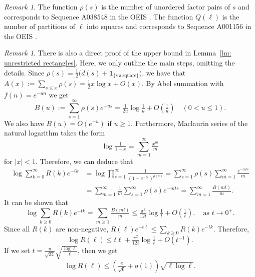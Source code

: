 \documentclass[12pt,a4paper]{amsart}
\numberwithin{equation}{section}
\theoremstyle{plain}
\theoremstyle{definition}
\theoremstyle{remark}
\newtheorem{re}[thm]{Remark}
\begin{document}
\begin{re}
The function $\rho(s)$ is the number of unordered factor pairs of $s$ and corresponds to Sequence A038548 in the OEIS \cite{OEISA038548}. The function $Q(\ell)$ is the number of partitions of $\ell$ into squares and corresponds to Sequence A001156 in the OEIS \cite{OEISA001156}.
\end{re}


\begin{re}
There is also a direct proof of the upper bound in Lemma~\ref{lm: unrestricted rectangles}. Here, we only outline the main steps, omitting the details.
Since
$\rho(s)=\tfrac12\bigl(d(s)+\mathbf 1_{\{s\ \mathrm{a\ square}\}}\bigr)$, we have that
$
A(x):=\sum_{s\le  x}\rho(s)=\tfrac12x\log x+O(x).
$
By Abel summation with $f(n)=e^{-un}$ we get
$$
B(u):=\sum_{s=1}^\infty\rho(s)e^{-us}=\tfrac{1}{2u}\log\tfrac{1}{u}+O\!\left(\tfrac{1}{u}\right)
\quad(0<u\le 1).$$
We also have 
$B(u)=O(e^{-u})$ if $u\ge 1$.
Furthermore, Maclaurin series of the natural logarithm takes the form
$$\log\tfrac{1}{1-x}=\sum_{m=1}^\infty\tfrac{x^{m}}{m}$$ 
for $|x|<1$. %
Therefore, we can deduce that
\begin{align*}
    \log \sum_{k=0}^\infty R(k)e^{-tk}&=\log \prod_{s=1}^{\infty}\tfrac{1}{(1-e^{-ts})^{\rho(s)}}=\sum_{s=1}^\infty\rho(s)
\sum_{m=1}^\infty\tfrac{e^{-mts}}m\\
&=\sum_{m=1}^\infty\tfrac{1}{m}
\sum_{s=1}^\infty\rho(s)e^{-mts}=\sum_{m=1}^\infty\tfrac{B(mt)}{m}.
\end{align*} 
It can be shown that
$$
\log \sum_{k\geq0}R(k)e^{-tk}=\sum_{m\ge1}\tfrac{B(mt)}{m} \le\tfrac{\pi^{2}}{12t}\log\tfrac1t+O\!\left(\tfrac1t\right),\quad \text{as }t\to0^{+}.
$$
Since all $R(k)$ are non-negative, $R(\ell)e^{-t\ell}\le \sum_{k\geq0}R(k)e^{-tk}$. Therefore,
$$\log R(\ell)\le  t\ell+\tfrac{\pi^{2}}{12t}\log\tfrac1t+O(t^{-1}).$$ 
If we set
$t=\tfrac{\pi}{\sqrt{24}}\sqrt{\tfrac{\log\ell}{\ell}}$, then we get
$$
\log R(\ell)\le \left(\tfrac{\pi}{\sqrt6}+o(1)\right)\sqrt{\ell\log\ell}.
$$
\end{re}

\end{document}
